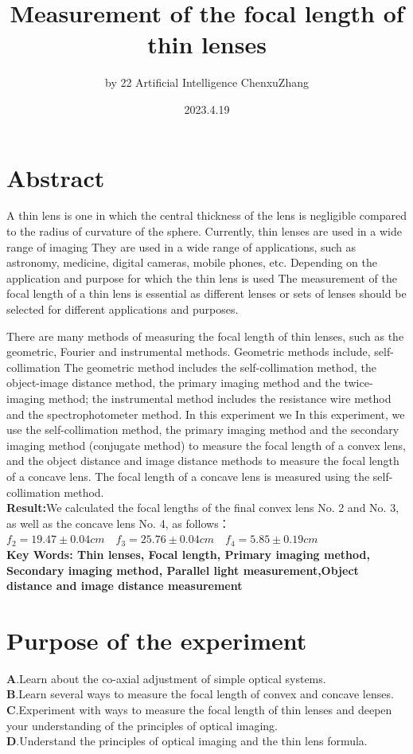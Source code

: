 \documentclass[UTF8]{article}
\title{Measurement of the focal length of thin lenses}
\author{by 22 Artificial Intelligence ChenxuZhang}
\date{2023.4.19}
\begin{document}
	
	\fancyfoot[C]{\thepage}
	
	\maketitle
	\tableofcontents
	\newpage
	
	\section{Abstract}
A thin lens is one in which the central thickness of the lens is negligible compared to the radius of curvature of the sphere. Currently, thin lenses are used in a wide range of imaging They are used in a wide range of applications, such as astronomy, medicine, digital cameras, mobile phones, etc. Depending on the application and purpose for which the thin lens is used The measurement of the focal length of a thin lens is essential as different lenses or sets of lenses should be selected for different applications and purposes.

There are many methods of measuring the focal length of thin lenses, such as the geometric, Fourier and instrumental methods. Geometric methods include, self-collimation The geometric method includes the self-collimation method, the object-image distance method, the primary imaging method and the twice-imaging method; the instrumental method includes the resistance wire method and the spectrophotometer method. In this experiment we In this experiment, we use the self-collimation method, the primary imaging method and the secondary imaging method (conjugate method) to measure the focal length of a convex lens, and the object distance and image distance methods to measure the focal length of a concave lens. The focal length of a concave lens is measured using the self-collimation method.\\
	
	\textbf{Result:}We calculated the focal lengths of the final convex lens No. 2 and No. 3, as well as the concave lens No. 4, as follows：$f_2 = 19.47\pm 0.04cm \quad f_3 = 25.76  \pm 0.04cm \quad f_4 = 5.85\pm 0.19cm$\\
	\textbf{Key Words: Thin lenses, Focal length, Primary imaging method, Secondary imaging method, Parallel light measurement,Object distance and image distance measurement}
	
	
	\section{Purpose of the experiment}
   $\bm{A}$.Learn about the co-axial adjustment of simple optical systems.\\
   $\bm{B}$.Learn several ways to measure the focal length of convex and concave lenses.\\
   $\bm{C}$.Experiment with ways to measure the focal length of thin lenses and deepen your understanding of the principles of optical imaging.\\
   $\bm{D}$.Understand the principles of optical imaging and the thin lens formula.
      
\end{document}
